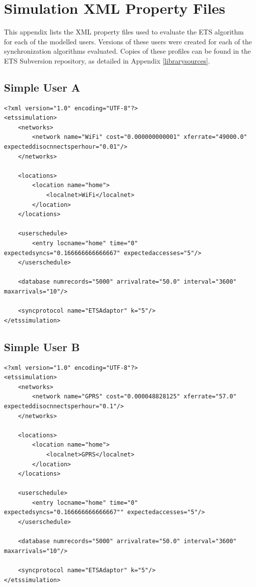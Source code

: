 \chapter{Simulation XML Property Files}\label{propertyfiles}

This appendix lists the XML property files used to evaluate the ETS algorithm for each of the modelled users.  Versions of these users were created for each of the synchronization algorithms evaluated.  Copies of these profiles can be found in the ETS Subversion repository, as detailed in Appendix \ref{librarysources}.

\section{Simple User A}\label{basic_a}

\begin{lstlisting}
<?xml version="1.0" encoding="UTF-8"?>
<etssimulation>
	<networks>
		<network name="WiFi" cost="0.000000000001" xferrate="49000.0" expecteddisocnnectsperhour="0.01"/>
	</networks>

	<locations>
		<location name="home">
			<localnet>WiFi</localnet>
		</location>
	</locations>

	<userschedule>
		<entry locname="home" time="0" expectedsyncs="0.166666666666667" expectedaccesses="5"/>
	</userschedule>

	<database numrecords="5000" arrivalrate="50.0" interval="3600" maxarrivals="10"/>

	<syncprotocol name="ETSAdaptor" k="5"/>
</etssimulation>
\end{lstlisting}

\section{Simple User B}\label{basic_b}

\begin{lstlisting}
<?xml version="1.0" encoding="UTF-8"?>
<etssimulation>
	<networks>
		<network name="GPRS" cost="0.000048828125" xferrate="57.0" expecteddisocnnectsperhour="0.1"/>
	</networks>

	<locations>
		<location name="home">
			<localnet>GPRS</localnet>
		</location>
	</locations>

	<userschedule>
		<entry locname="home" time="0" expectedsyncs="0.166666666666667"" expectedaccesses="5"/>
	</userschedule>

	<database numrecords="5000" arrivalrate="50.0" interval="3600" maxarrivals="10"/>

	<syncprotocol name="ETSAdaptor" k="5"/>
</etssimulation>
\end{lstlisting}

